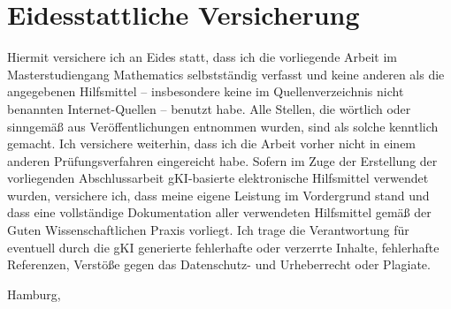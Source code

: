 \chapter*{Eidesstattliche Versicherung}
{\normalsize
Hiermit versichere ich an Eides statt, dass ich die vorliegende Arbeit im Masterstudiengang Mathematics selbstständig verfasst und keine anderen als die angegebenen Hilfsmittel – insbesondere keine im Quellenverzeichnis nicht benannten Internet-Quellen – benutzt habe. Alle Stellen, die wörtlich oder sinngemäß aus Veröffentlichungen entnommen wurden, sind als solche kenntlich gemacht. Ich versichere weiterhin, dass ich die Arbeit vorher nicht in einem anderen Prüfungsverfahren eingereicht habe.
Sofern im Zuge der Erstellung der vorliegenden Abschlussarbeit gKI-basierte elektronische Hilfsmittel verwendet wurden, versichere ich, dass meine eigene Leistung im Vordergrund stand und dass eine vollständige Dokumentation aller verwendeten Hilfsmittel gemäß der Guten Wissenschaftlichen Praxis vorliegt. Ich trage die Verantwortung für eventuell durch die gKI generierte fehlerhafte oder verzerrte Inhalte, fehlerhafte Referenzen, Verstöße gegen das Datenschutz- und Urheberrecht oder Plagiate.
\vspace*{1cm}

 
\noindent
\begin{minipage}[t]{0.4\linewidth}
Hamburg,\dotfill\\
\vspace*{2.5mm}
\end{minipage}
\hspace*{0.1\linewidth}
\begin{minipage}[t]{0.45\linewidth}
  \begin{center}
    \dotfill\\
    \name
    \end{center}
\end{minipage}

}
\hfill
\clearpage
\thispagestyle{empty}